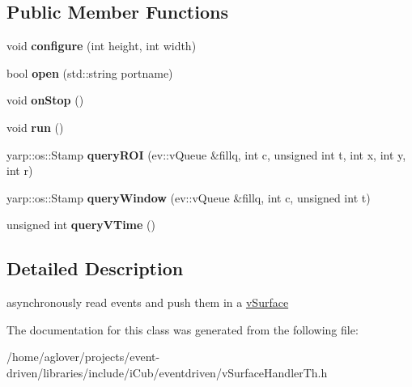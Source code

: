 \subsection*{Public Member Functions}
\begin{DoxyCompactItemize}
\item 
void {\bfseries configure} (int height, int width)\hypertarget{classev_1_1surfaceThread_a17d8e5af5b6617d91631fe3565e7ec21}{}\label{classev_1_1surfaceThread_a17d8e5af5b6617d91631fe3565e7ec21}

\item 
bool {\bfseries open} (std\+::string portname)\hypertarget{classev_1_1surfaceThread_a8fbb7a7f67aeb8766ee1d222550306c9}{}\label{classev_1_1surfaceThread_a8fbb7a7f67aeb8766ee1d222550306c9}

\item 
void {\bfseries on\+Stop} ()\hypertarget{classev_1_1surfaceThread_a65d324c3c3d8f699412f4fa1eb5aff62}{}\label{classev_1_1surfaceThread_a65d324c3c3d8f699412f4fa1eb5aff62}

\item 
void {\bfseries run} ()\hypertarget{classev_1_1surfaceThread_a04b53ae45896e77a84db501ddfc956cf}{}\label{classev_1_1surfaceThread_a04b53ae45896e77a84db501ddfc956cf}

\item 
yarp\+::os\+::\+Stamp {\bfseries query\+R\+OI} (ev\+::v\+Queue \&fillq, int c, unsigned int t, int x, int y, int r)\hypertarget{classev_1_1surfaceThread_a04b8a2e62c4910346bdfc2ae9c82371b}{}\label{classev_1_1surfaceThread_a04b8a2e62c4910346bdfc2ae9c82371b}

\item 
yarp\+::os\+::\+Stamp {\bfseries query\+Window} (ev\+::v\+Queue \&fillq, int c, unsigned int t)\hypertarget{classev_1_1surfaceThread_ad552b309bca76006c5e8adc07fdcbb6a}{}\label{classev_1_1surfaceThread_ad552b309bca76006c5e8adc07fdcbb6a}

\item 
unsigned int {\bfseries query\+V\+Time} ()\hypertarget{classev_1_1surfaceThread_a763bb2d669fdc772316f074fd43c82d8}{}\label{classev_1_1surfaceThread_a763bb2d669fdc772316f074fd43c82d8}

\end{DoxyCompactItemize}


\subsection{Detailed Description}
asynchronously read events and push them in a \hyperlink{classev_1_1vSurface}{v\+Surface} 

The documentation for this class was generated from the following file\+:\begin{DoxyCompactItemize}
\item 
/home/aglover/projects/event-\/driven/libraries/include/i\+Cub/eventdriven/v\+Surface\+Handler\+Th.\+h\end{DoxyCompactItemize}
